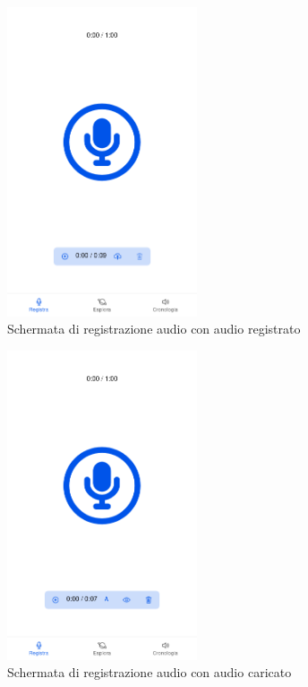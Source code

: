 \documentclass[a4paper]{article}
\begin{document}
\begin{figure}[h]
	\centering
	\includegraphics[width=0.5\textwidth]{./recorded-audio.png}
	\caption{Schermata di registrazione audio con audio registrato}
\end{figure}

\begin{figure}[h]
	\centering
	\includegraphics[width=0.5\textwidth]{./redorded-uploaded.png}
	\caption{Schermata di registrazione audio con audio caricato}
\end{figure}
\end{document}
